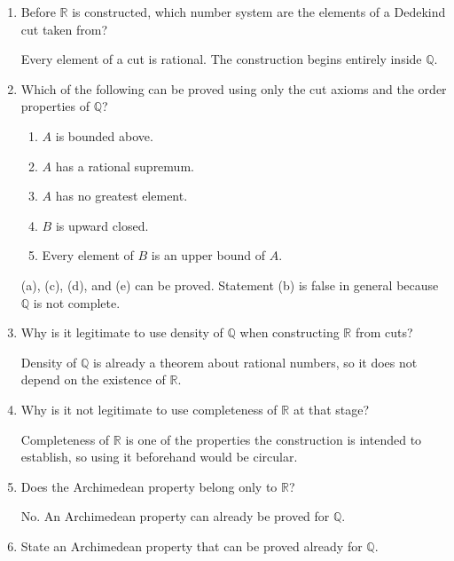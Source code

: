\documentclass{self-check}
\begin{document}
\begin{enumerate}[label=\arabic{*}., itemsep=10pt]
  \item Before \(\mathbb{R}\) is constructed, which number system are the elements of a Dedekind cut taken from?

    \begin{answer}
      Every element of a cut is rational. The construction begins entirely inside \(\mathbb{Q}\).
    \end{answer}
  \item Which of the following can be proved using only the cut axioms and the order properties of \(\mathbb{Q}\)?
    \begin{enumerate}[label=(\alph{*})]
      \item \(A\) is bounded above.
      \item \(A\) has a rational supremum.
      \item \(A\) has no greatest element.
      \item \(B\) is upward closed.
      \item Every element of \(B\) is an upper bound of \(A\).
    \end{enumerate}

    \begin{answer}
      (a), (c), (d), and (e) can be proved. Statement (b) is false in general because \(\mathbb{Q}\) is not complete.
    \end{answer}
  \item Why is it legitimate to use density of \(\mathbb{Q}\) when constructing \(\mathbb{R}\) from cuts?

    \begin{answer}
      Density of \(\mathbb{Q}\) is already a theorem about rational numbers, so it does not depend on the existence of \(\mathbb{R}\).
    \end{answer}
  \item Why is it not legitimate to use completeness of \(\mathbb{R}\) at that stage?

    \begin{answer}
      Completeness of \(\mathbb{R}\) is one of the properties the construction is intended to establish, so using it beforehand would be circular.
    \end{answer}
  \item Does the Archimedean property belong only to \(\mathbb{R}\)?

    \begin{answer}
      No. An Archimedean property can already be proved for \(\mathbb{Q}\).
    \end{answer}
  \item State an Archimedean property that can be proved already for \(\mathbb{Q}\).


\end{enumerate}
\end{document}
